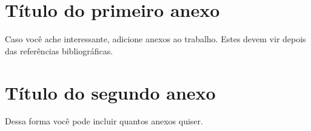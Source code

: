 \documentclass[12pt,a4paper,header]{abnt}
\begin{document}



\anexo



\chapter{Título do primeiro anexo}

Caso você ache interessante, adicione anexos ao trabalho. Estes devem vir depois das referências bibliográficas. 



\chapter{Título do segundo anexo}

Dessa forma você pode incluir quantos anexos quiser. 
\end{document}
